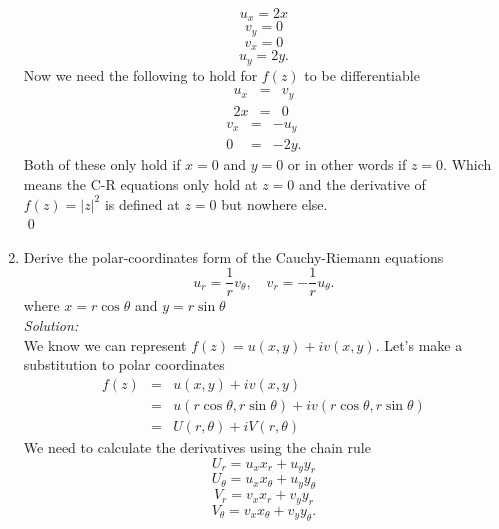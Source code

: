 \documentclass[10pt]{amsart}
\theoremstyle{nonumberplain}
\begin{document}
\begin{enumerate}[label={\bf {\arabic*}:}]
$$u_x = 2x$$ $$v_y = 0$$ $$v_x = 0$$ $$u_y = 2y.$$
Now we need the following to hold for $f(z)$ to be differentiable
\begin{eqnarray*}
u_x &=& v_y \\
2x &=& 0
\end{eqnarray*}
\begin{eqnarray*}
v_x &=& - u_y \\
0 &=& - 2y.
\end{eqnarray*}
Both of these only hold if $x=0$ and $y=0$ or in other words if $z=0$.
Which means the C-R equations only hold at $z=0$ and the derivative of $f(z) = |z|^2$ is defined at $z=0$ but nowhere else. \\
\qed

\item Derive the polar-coordinates form of the Cauchy-Riemann equations
$$
u_r=\frac{1}{r} v_\theta, \quad v_r=-\frac{1}{r} u_\theta.
$$
where $x=r \cos \theta$ and $y=r \sin \theta$ \\
\textit{Solution:} \\
We know we can represent $f(z) = u(x, y) + i v(x, y)$.
Let's make a substitution to polar coordinates
\begin{eqnarray*}
f(z) &=& u(x, y) + i v(x, y) \\
      &=& u(r \cos \theta, r \sin \theta) + i v(r \cos \theta, r \sin \theta) \\
      &=& U(r, \theta) + iV(r, \theta)
\end{eqnarray*}
We need to calculate the derivatives using the chain rule
$$U_r = u_xx_r + u_yy_r$$
$$U_\theta = u_xx_\theta + u_yy_\theta$$
$$V_r = v_xx_r + v_yy_r$$
$$V_\theta = v_xx_\theta + v_yy_\theta.$$


\end{enumerate}
\end{document}
